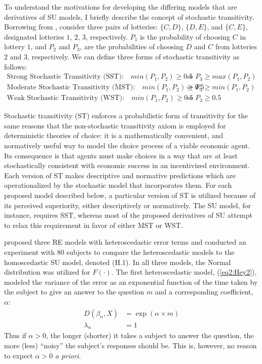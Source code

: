 \documentclass[../main.tex]{subfiles}
\begin{document}
To understand the motivations for developing the differing models that are derivatives of SU models, I briefly describe the concept of stochastic transitivity.
Borrowing from \textcite[210]{Wilcox2008}, consider three pairs of lotteries: $\{C,D\}$, $\{D,E\}$, and $\{C,E\}$, designated lotteries $1$, $2$, $3$, respectively.
$P_1$ is the probability of choosing $C$ in lottery $1$, and $P_2$ and $P_3$, are the probabilities of choosing $D$ and $C$ from lotteries $2$ and $3$, respectively.
We can define three forms of stochastic transitivity as follows:
\begin{align*}
	\text{Strong Stochastic Transitivity (SST):} \quad \mathit{min}(P_1,P_2) \geq 0.5 &\Rightarrow P_3 \geq \mathit{max}(P_1,P_2) \\
	\text{Moderate Stochastic Transitivity (MST):} \quad \mathit{min}(P_1,P_2) \geq 0.5 &\Rightarrow P_3 \geq \mathit{min}(P_1,P_2)\\
	\text{Weak Stochastic Transitivity (WST):} \quad \mathit{min}(P_1,P_2) \geq 0.5 &\Rightarrow P_3 \geq 0.5
\end{align*}

Stochastic transitivity (ST) enforces a probabilistic form of transitivity for the same reasons that the non-stochastic transitivity axiom is employed for deterministic theories of choice: it is a mathematically convenient, and normatively useful way to model the choice process of a viable economic agent.
Its consequence is that agents must make choices in a way that are at least stochastically consistent with economic success in an incentivized environment.
Each version of ST makes descriptive and normative predictions which are operationalized by the stochastic model that incorporates them.
For each proposed model described below, a particular version of ST is utilized because of its perceived superiority, either descriptively or normatively.
The SU model, for instance, requires SST, whereas most of the proposed derivatives of SU attempt to relax this requirement in favor of either MST or WST.

\textcite{Hey1995a} proposed three RE models with heteroscedastic error terms and conducted an experiment with 80 subjects to compare the heteroscedastic models to the homoscedastic SU model, denoted (H.1).
In all three models, the Normal distribution was utilized for $F(\cdot)$.
The first heteroscedastic model, (\ref{eq2:Hey2}), modeled the variance of the error as an exponential function of the time taken by the subject to give an answer to the question $m$ and a corresponding coefficient, $\alpha$:
\begin{align*}
	\tag{H.2}
	\label{eq2:Hey2}
	D(\beta_n,X) &= \exp(\alpha \times m)\\
	\lambda_n &= 1
\end{align*}
Thus if $\alpha > 0$, the longer (shorter) it takes a subject to answer the question, the more (less) \enquote{noisy} the subject's responses should be.
This is, however, no reason to expect $\alpha > 0$ \textit{a priori}.
\end{document}
